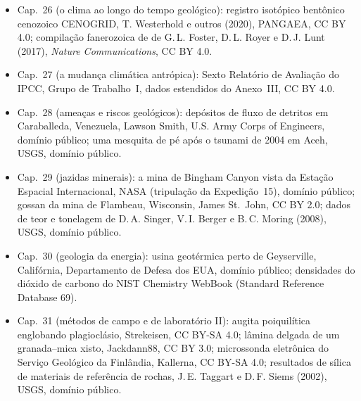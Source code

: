 \begin{itemize}
  \item Cap.~26 (o clima ao longo do tempo geológico): registro isotópico bentônico cenozoico CENOGRID, T. Westerhold e outros (2020), PANGAEA, CC BY 4.0; compilação fanerozoica de  de G.\,L. Foster, D.\,L. Royer e D.\,J. Lunt (2017), \emph{Nature Communications}, CC BY 4.0.
  \item Cap.~27 (a mudança climática antrópica): Sexto Relatório de Avaliação do IPCC, Grupo de Trabalho~I, dados estendidos do Anexo~III, CC BY 4.0.
  \item Cap.~28 (ameaças e riscos geológicos): depósitos de fluxo de detritos em Caraballeda, Venezuela, Lawson Smith, U.S. Army Corps of Engineers, domínio público; uma mesquita de pé após o tsunami de 2004 em Aceh, USGS, domínio público.
  \item Cap.~29 (jazidas minerais): a mina de Bingham Canyon vista da Estação Espacial Internacional, NASA (tripulação da Expedição~15), domínio público; gossan da mina de Flambeau, Wisconsin, James St.~John, CC BY 2.0; dados de teor e tonelagem de D.\,A. Singer, V.\,I. Berger e B.\,C. Moring (2008), USGS, domínio público.
  \item Cap.~30 (geologia da energia): usina geotérmica perto de Geyserville, Califórnia, Departamento de Defesa dos EUA, domínio público; densidades do dióxido de carbono do NIST Chemistry WebBook (Standard Reference Database 69).
  \item Cap.~31 (métodos de campo e de laboratório II): augita poiquilítica englobando plagioclásio, Strekeisen, CC BY-SA 4.0; lâmina delgada de um granada--mica xisto, Jackdann88, CC BY 3.0; microssonda eletrônica do Serviço Geológico da Finlândia, Kallerna, CC BY-SA 4.0; resultados de sílica de materiais de referência de rochas, J.\,E. Taggart e D.\,F. Siems (2002), USGS, domínio público.
\end{itemize}
